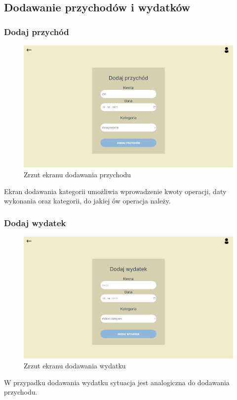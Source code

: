 \documentclass[12pt,a4paper,oneside]{article}
\begin{document}
\subsection{Dodawanie przychodów i wydatków}
\subsubsection{Dodaj przychód}
\begin{figure}[H]
    \centering
    \includegraphics[width=\hsize,keepaspectratio]{images/add_income.png}
    \caption{Zrzut ekranu dodawania przychodu}
\end{figure}
Ekran dodawania kategorii umożliwia wprowadzenie kwoty operacji, daty wykonania
oraz kategorii, do jakiej ów operacja należy.

\subsubsection{Dodaj wydatek}
\begin{figure}[H]
    \centering
    \includegraphics[width=\hsize,keepaspectratio]{images/add_expense.png}
    \caption{Zrzut ekranu dodawania wydatku}
\end{figure}
W przypadku dodawania wydatku sytuacja jest analogiczna do dodawania przychodu.
\end{document}

